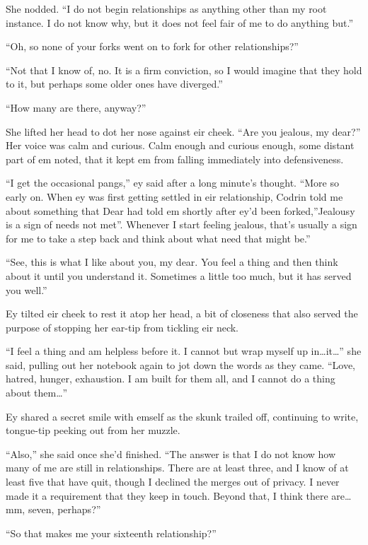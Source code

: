 She nodded. ``I do not begin relationships as anything other than my root instance. I do not know why, but it does not feel fair of me to do anything but.''

``Oh, so none of your forks went on to fork for other relationships?''

``Not that I know of, no. It is a firm conviction, so I would imagine that they hold to it, but perhaps some older ones have diverged.''

``How many are there, anyway?''

She lifted her head to dot her nose against eir cheek. ``Are you jealous, my dear?'' Her voice was calm and curious. Calm enough and curious enough, some distant part of em noted, that it kept em from falling immediately into defensiveness.

``I get the occasional pangs,'' ey said after a long minute's thought. ``More so early on. When ey was first getting settled in eir relationship, Codrin told me about something that Dear had told em shortly after ey'd been forked,''Jealousy is a sign of needs not met''. Whenever I start feeling jealous, that's usually a sign for me to take a step back and think about what need that might be.''

``See, this is what I like about you, my dear. You feel a thing and then think about it until you understand it. Sometimes a little too much, but it has served you well.''

Ey tilted eir cheek to rest it atop her head, a bit of closeness that also served the purpose of stopping her ear-tip from tickling eir neck.

``I feel a thing and am helpless before it. I cannot but wrap myself up in\ldots it\ldots{}'' she said, pulling out her notebook again to jot down the words as they came. ``Love, hatred, hunger, exhaustion. I am built for them all, and I cannot do a thing about them\ldots{}''

Ey shared a secret smile with emself as the skunk trailed off, continuing to write, tongue-tip peeking out from her muzzle.

``Also,'' she said once she'd finished. ``The answer is that I do not know how many of me are still in relationships. There are at least three, and I know of at least five that have quit, though I declined the merges out of privacy. I never made it a requirement that they keep in touch. Beyond that, I think there are\ldots mm, seven, perhaps?''

``So that makes me your sixteenth relationship?''

